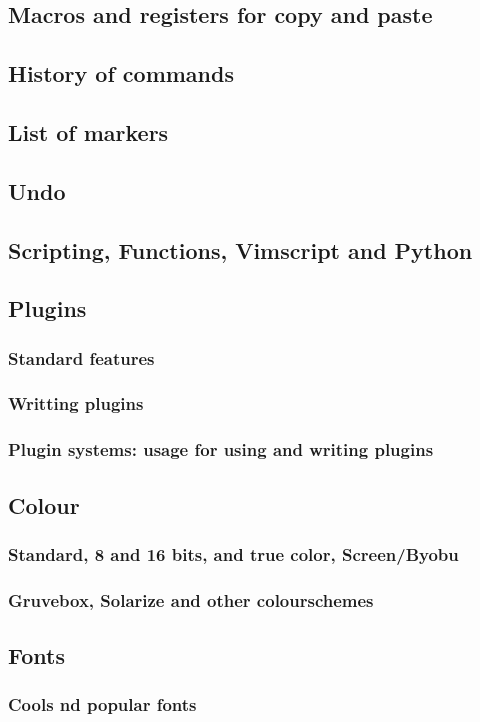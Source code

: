 \documentclass{article}
\begin{document}
\subsection{Macros and registers for copy and paste}
\subsection{History of commands}
\subsection{List of markers}
\subsection{Undo}
\subsection{Scripting, Functions, Vimscript and Python}
\subsection{Plugins}
\subsubsection{Standard features}
\subsubsection{Writting plugins}
\subsubsection{Plugin systems: usage for using and writing plugins}
\subsection{Colour}
\subsubsection{Standard, 8 and 16 bits, and true color, Screen/Byobu}
\subsubsection{Gruvebox, Solarize and other colourschemes}
\subsection{Fonts}
\subsubsection{Cools nd popular fonts}
\end{document}
